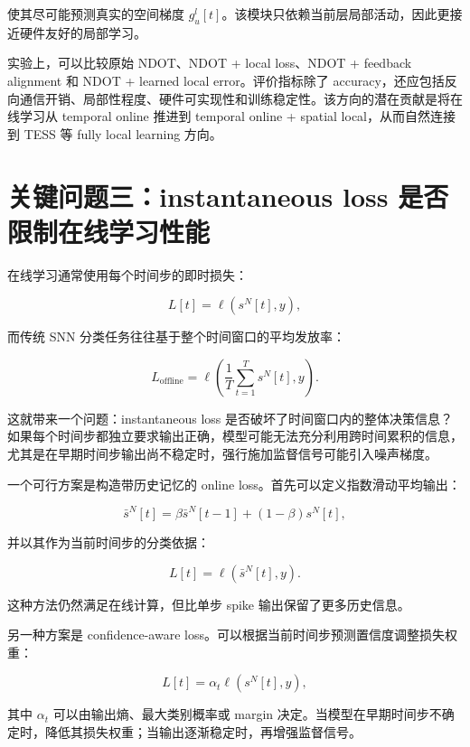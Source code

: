 \documentclass[11pt]{ctexart}
\begin{document}
使其尽可能预测真实的空间梯度 $g_u^l[t]$。该模块只依赖当前层局部活动，因此更接近硬件友好的局部学习。

实验上，可以比较原始 NDOT、NDOT + local loss、NDOT + feedback alignment 和 NDOT + learned local error。评价指标除了 accuracy，还应包括反向通信开销、局部性程度、硬件可实现性和训练稳定性。该方向的潜在贡献是将在线学习从 temporal online 推进到 temporal online + spatial local，从而自然连接到 TESS 等 fully local learning 方向。

\section{关键问题三：instantaneous loss 是否限制在线学习性能}

在线学习通常使用每个时间步的即时损失：

\begin{equation}
L[t] = \ell(s^N[t], y),
\end{equation}

而传统 SNN 分类任务往往基于整个时间窗口的平均发放率：

\begin{equation}
L_{\mathrm{offline}}
=
\ell\left(\frac{1}{T}\sum_{t=1}^{T}s^N[t], y\right).
\end{equation}

这就带来一个问题：instantaneous loss 是否破坏了时间窗口内的整体决策信息？如果每个时间步都独立要求输出正确，模型可能无法充分利用跨时间累积的信息，尤其是在早期时间步输出尚不稳定时，强行施加监督信号可能引入噪声梯度。

一个可行方案是构造带历史记忆的 online loss。首先可以定义指数滑动平均输出：

\begin{equation}
\bar{s}^N[t]
=
\beta \bar{s}^N[t-1]
+(1-\beta)s^N[t],
\end{equation}

并以其作为当前时间步的分类依据：

\begin{equation}
L[t] = \ell(\bar{s}^N[t],y).
\end{equation}

这种方法仍然满足在线计算，但比单步 spike 输出保留了更多历史信息。

另一种方案是 confidence-aware loss。可以根据当前时间步预测置信度调整损失权重：

\begin{equation}
L[t]=\alpha_t\ell(s^N[t],y),
\end{equation}

其中 $\alpha_t$ 可以由输出熵、最大类别概率或 margin 决定。当模型在早期时间步不确定时，降低其损失权重；当输出逐渐稳定时，再增强监督信号。
\end{document}
